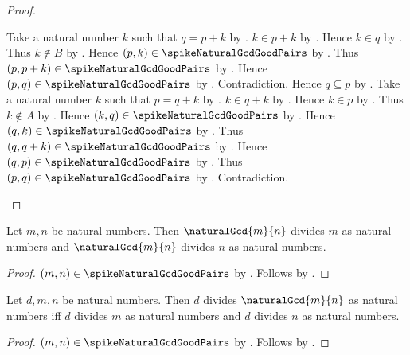 \begin{proof}
    \begin{byCase}
            Take a natural number $k$ such that $q=p+k$
                by .
            $k\in p+k$
                by .
            Hence $k\in q$ by \auto.
            Thus $k\notin B$ by .
            Hence $(p,k)\in\spikeNaturalGcdGoodPairs$
                by \auto.
            Thus $(p,p+k)\in\spikeNaturalGcdGoodPairs$
                by .
            Hence $(p,q)\in\spikeNaturalGcdGoodPairs$ by \auto.
            Contradiction.
            Hence $q\subseteq p$
                by .
            Take a natural number $k$ such that $p=q+k$
                by .
            $k\in q+k$
                by .
            Hence $k\in p$ by \auto.
            Thus $k\notin A$ by .
            Hence $(k,q)\in\spikeNaturalGcdGoodPairs$
                by \auto.
            Hence $(q,k)\in\spikeNaturalGcdGoodPairs$
                by .
            Thus $(q,q+k)\in\spikeNaturalGcdGoodPairs$
                by .
            Hence $(q,p)\in\spikeNaturalGcdGoodPairs$ by \auto.
            Thus $(p,q)\in\spikeNaturalGcdGoodPairs$
                by .
            Contradiction.
    \end{byCase}
\end{proof}

\begin{theorem}\label{spike15_natural_gcd_common_divisor}
    Let $m,n$ be natural numbers.
    Then $\naturalGcd{m}{n}$ divides $m$ as natural numbers and
        $\naturalGcd{m}{n}$ divides $n$ as natural numbers.
\end{theorem}
\begin{proof}
    $(m,n)\in\spikeNaturalGcdGoodPairs$
        by .
    Follows by .
\end{proof}

\begin{theorem}\label{spike15_natural_gcd_universal}
    Let $d,m,n$ be natural numbers.
    Then $d$ divides $\naturalGcd{m}{n}$ as natural numbers iff
        $d$ divides $m$ as natural numbers and
        $d$ divides $n$ as natural numbers.
\end{theorem}
\begin{proof}
    $(m,n)\in\spikeNaturalGcdGoodPairs$
        by .
    Follows by .
\end{proof}


